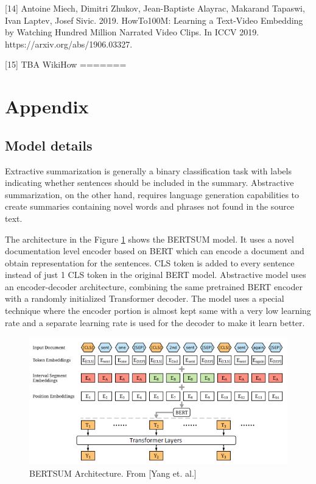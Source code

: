 \documentclass{article}
\begin{document}
[14] Antoine Miech, Dimitri Zhukov, Jean-Baptiste Alayrac, Makarand Tapaswi, Ivan Laptev, Josef Sivic. 2019. HowTo100M: Learning a Text-Video Embedding by Watching Hundred Million Narrated Video Clips. In ICCV 2019. https://arxiv.org/abs/1906.03327.
 
[15] TBA WikiHow
=======

\section{Appendix}
\subsection{Model details}
Extractive summarization is generally a binary classification task with labels indicating whether sentences should be included in the summary. Abstractive summarization, on the other hand, requires language generation capabilities to create summaries containing novel words and phrases not found in the source text. 

The architecture in the Figure \ref{fig:architecure} shows the BERTSUM model. It uses a novel documentation level encoder based on BERT which can encode a document and obtain representation for the sentences. CLS token is added to every sentence instead of just 1 CLS token in the original BERT model. Abstractive model uses an encoder-decoder architecture, combining the same pretrained BERT encoder with a randomly initialized Transformer decoder. The model uses a special technique where the encoder portion is almost kept same with a very low learning rate and a separate learning rate is used for the decoder to make it learn better. 

\begin{figure}[H]
  \centering
  \includegraphics[scale=0.5]{bertsumarchitecture.png}
  \caption{BERTSUM Architecture. From [Yang et. al.]}
  \label{fig:architecure}
\end{figure}
\end{document}
